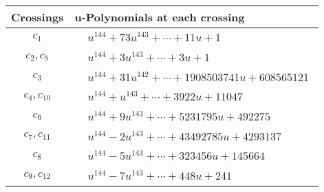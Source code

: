 \documentclass[1p]{elsarticle_modified}
\theoremstyle{definition}
\begin{document}
\begin{tabular}{m{50pt}|m{274pt}}
Crossings & \hspace{64pt}u-Polynomials at each crossing \\
\hline $$\begin{aligned}c_{1}\end{aligned}$$&$\begin{aligned}
&u^{144}+73 u^{143}+\cdots+11 u+1
\end{aligned}$\\
\hline $$\begin{aligned}c_{2},c_{5}\end{aligned}$$&$\begin{aligned}
&u^{144}+3 u^{143}+\cdots+3 u+1
\end{aligned}$\\
\hline $$\begin{aligned}c_{3}\end{aligned}$$&$\begin{aligned}
&u^{144}+31 u^{142}+\cdots+1908503741 u+608565121
\end{aligned}$\\
\hline $$\begin{aligned}c_{4},c_{10}\end{aligned}$$&$\begin{aligned}
&u^{144}+u^{143}+\cdots+3922 u+11047
\end{aligned}$\\
\hline $$\begin{aligned}c_{6}\end{aligned}$$&$\begin{aligned}
&u^{144}+9 u^{143}+\cdots+5231795 u+492275
\end{aligned}$\\
\hline $$\begin{aligned}c_{7},c_{11}\end{aligned}$$&$\begin{aligned}
&u^{144}-2 u^{143}+\cdots+43492785 u+4293137
\end{aligned}$\\
\hline $$\begin{aligned}c_{8}\end{aligned}$$&$\begin{aligned}
&u^{144}-5 u^{143}+\cdots+323456 u+145664
\end{aligned}$\\
\hline $$\begin{aligned}c_{9},c_{12}\end{aligned}$$&$\begin{aligned}
&u^{144}-7 u^{143}+\cdots+448 u+241
\end{aligned}$\\
\hline
\end{tabular}\\~\\
\end{document}
